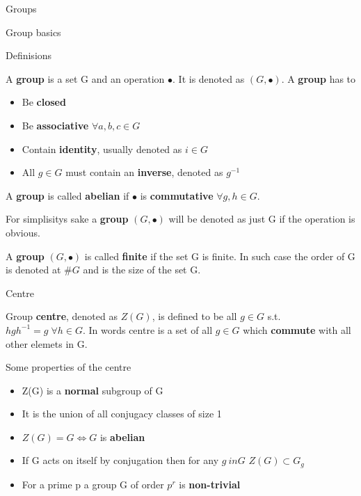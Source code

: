 \documentclass[12pt, letterpaper]{article}
\begin{document}
\begin{section}{Groups}

  \begin{subsection}{Group basics}

    \begin{subsubsection}{Definisions}

      A \textbf{group} is a set G and an operation \(\bullet\). It is denoted as
      \((G, \bullet)\). A \textbf{group} has to
      \begin{itemize}
        \item Be \textbf{closed}
        \item Be \textbf{associative} \(\forall a,b,c \in G\)
        \item Contain \textbf{identity}, usually denoted as \(i \in G\)
        \item All \(g \in G\) must contain an \textbf{inverse}, denoted as \(g^{-1}\)
      \end{itemize}
      A \textbf{group} is called \textbf{abelian} if \(\bullet\) is \textbf{commutative}
      \(\forall g, h \in G\).

      For simplisitys sake a \textbf{group} \((G, \bullet)\) will be denoted as just G
      if the operation is obvious.

      A \textbf{group} \((G, \bullet)\) is called \textbf{finite} if the set G is finite.
      In such case the order of G is denoted at \(\#G\) and is the size of the set G.

    \end{subsubsection}

    \begin{subsubsection}{Centre}

      Group \textbf{centre}, denoted as \(Z(G)\), is defined to be all
      \(g \in G\) s.t.\ \(hgh^{-1} = g \; \forall h \in G\). In words centre is
      a set of all \(g \in G\) which \textbf{commute} with all other elemets in G.

      Some properties of the centre \:
      \begin{itemize}
        \item Z(G) is a \textbf{normal} subgroup of G
        \item It is the union of all conjugacy classes of size 1
        \item \(Z(G) = G \iff G\) is \textbf{abelian}
        \item If G acts on itself by conjugation then for any \(g \ in G\)
              \(Z(G) \subset G_{g}\)
        \item For a prime p a group G of order \(p^{r}\) is
              \textbf{non-trivial}
      \end{itemize}


\end{subsubsection}
\end{subsection}
\end{section}
\end{document}
